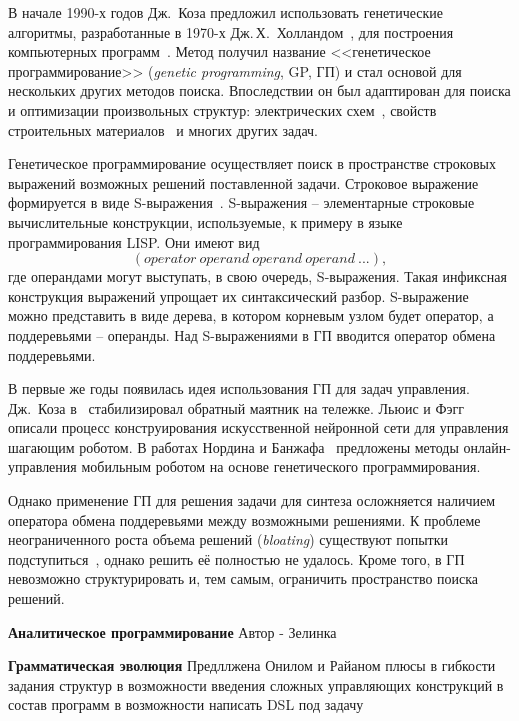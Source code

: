 В начале 1990-х годов Дж.~Коза предложил использовать генетические алгоритмы, разработанные в 1970-х Дж.\,Х.~Холландом~\cite{Holland1973, Holland1975}, для построения компьютерных программ~\cite{Koza1990, Koza1990a, Koza1992a}.
Метод получил название <<генетическое программирование>> (\textit{genetic programming}, GP, ГП) и стал основой для нескольких других методов поиска.
Впоследствии он был адаптирован для поиска и оптимизации произвольных структур: электрических схем~\cite{Wang2007}, свойств строительных материалов~\cite{Gonzalez-Taboada2016} и многих других задач.

Генетическое программирование осуществляет поиск в пространстве строковых выражений возможных решений поставленной задачи.
Строковое выражение формируется в виде S-выражения~\cite{McCarthy1960}.
S-выражения -- элементарные строковые вычислительные конструкции, используемые, к примеру в языке программирования LISP. 
Они имеют вид 
\begin{equation}
    \left(operator\ operand\ operand\ operand\ ...\right),
    \label{intro:s_expression}
\end{equation}
где операндами могут выступать, в свою очередь, S-выражения.
Такая инфиксная конструкция выражений упрощает их синтаксический разбор.
S-выражение можно представить в виде дерева, в котором корневым узлом будет оператор, а поддеревьями -- операнды.
Над S-выражениями в ГП вводится оператор обмена поддеревьями.

В первые же годы появилась идея использования ГП для задач управления.
Дж.~Коза в~\cite{Koza1992} стабилизировал обратный маятник на тележке.
Льюис и Фэгг~\cite{Lewis1992} описали процесс конструирования искусственной нейронной сети для управления шагающим роботом.
В работах Нордина и Банжафа~\cite{Nordin1996, Nordin1997} предложены методы онлайн-управления мобильным роботом на основе генетического программирования.

Однако применение ГП для решения задачи для синтеза осложняется наличием оператора обмена поддеревьями между возможными решениями. 
К проблеме неограниченного роста объема решений (\textit{bloating}) существуют попытки подступиться~\cite{Trujillo2016}, однако решить её полностью не удалось.
Кроме того, в ГП невозможно структурировать и, тем самым, ограничить пространство поиска решений.

\textbf{Аналитическое программирование}
Автор - Зелинка


% 
\textbf{Грамматическая эволюция}
Предллжена Онилом и Райаном
плюсы
в гибкости задания структур
в возможности введения сложных управляющих конструкций в состав программ
в возможности написать DSL под задачу

